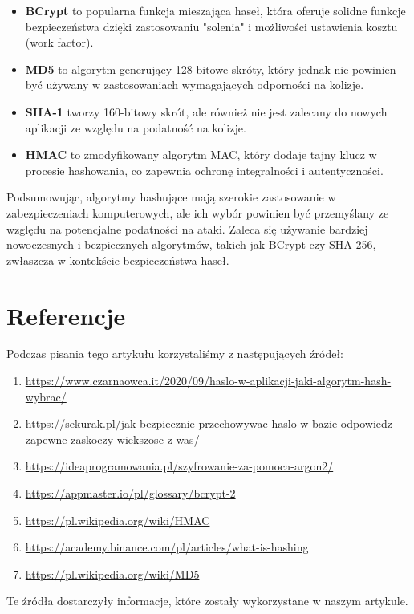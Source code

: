 \documentclass[12pt, letterpaper]{article}
\begin{document}
\begin{itemize}
    \item \textbf{BCrypt} to popularna funkcja mieszająca haseł, która oferuje solidne funkcje bezpieczeństwa dzięki zastosowaniu "solenia" i możliwości ustawienia kosztu (work factor).
    \item \textbf{MD5} to algorytm generujący 128-bitowe skróty, który jednak nie powinien być używany w zastosowaniach wymagających odporności na kolizje.
    \item \textbf{SHA-1} tworzy 160-bitowy skrót, ale również nie jest zalecany do nowych aplikacji ze względu na podatność na kolizje.
    \item \textbf{HMAC} to zmodyfikowany algorytm MAC, który dodaje tajny klucz w procesie hashowania, co zapewnia ochronę integralności i autentyczności.
\end{itemize}
Podsumowując, algorytmy hashujące mają szerokie zastosowanie w zabezpieczeniach komputerowych, ale ich wybór powinien być przemyślany ze względu na potencjalne podatności na ataki. Zaleca się używanie bardziej nowoczesnych i bezpiecznych algorytmów, takich jak BCrypt czy SHA-256, zwłaszcza w kontekście bezpieczeństwa haseł.
\newpage
\section{Referencje}
Podczas pisania tego artykułu korzystaliśmy z następujących źródeł:

\begin{enumerate}
    \item \href{https://www.czarnaowca.it/2020/09/haslo-w-aplikacji-jaki-algorytm-hash-wybrac/}{https://www.czarnaowca.it/2020/09/haslo-w-aplikacji-jaki-algorytm-hash-wybrac/}
    \item \href{https://sekurak.pl/jak-bezpiecznie-przechowywac-haslo-w-bazie-odpowiedz-zapewne-zaskoczy-wiekszosc-z-was/}{https://sekurak.pl/jak-bezpiecznie-przechowywac-haslo-w-bazie-odpowiedz-zapewne-zaskoczy-wiekszosc-z-was/}
    \item \href{https://ideaprogramowania.pl/szyfrowanie-za-pomoca-argon2/}{https://ideaprogramowania.pl/szyfrowanie-za-pomoca-argon2/}
    \item \href{https://appmaster.io/pl/glossary/bcrypt-2}{https://appmaster.io/pl/glossary/bcrypt-2}
    \item \href{https://pl.wikipedia.org/wiki/HMAC}{https://pl.wikipedia.org/wiki/HMAC}
    \item \href{https://academy.binance.com/pl/articles/what-is-hashing}{https://academy.binance.com/pl/articles/what-is-hashing}
    \item \href{https://pl.wikipedia.org/wiki/MD5}{https://pl.wikipedia.org/wiki/MD5}
\end{enumerate}

Te źródła dostarczyły informacje, które zostały wykorzystane w naszym artykule.
\end{document}
